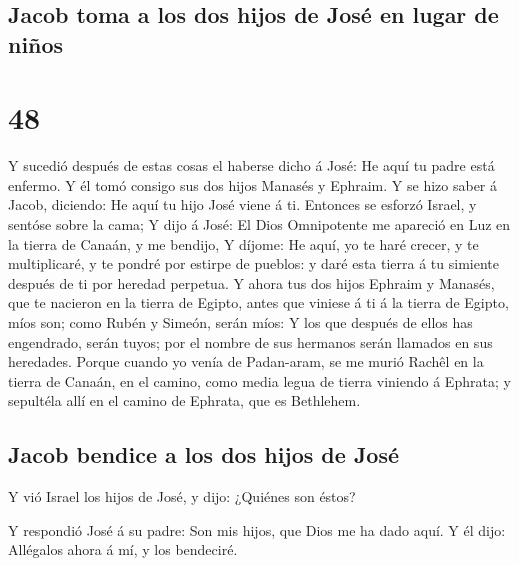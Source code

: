 \hypertarget{jacob-toma-a-los-dos-hijos-de-josuxe9-en-lugar-de-niuxf1os}{%
\subsection{Jacob toma a los dos hijos de José en lugar de
niños}\label{jacob-toma-a-los-dos-hijos-de-josuxe9-en-lugar-de-niuxf1os}}

\hypertarget{section-47}{%
\section{48}\label{section-47}}

 Y sucedió después de estas cosas el haberse dicho á José:
He aquí tu padre está enfermo. Y él tomó consigo sus dos hijos Manasés y
Ephraim.  Y se hizo saber á Jacob, diciendo: He aquí tu hijo
José viene á ti. Entonces se esforzó Israel, y sentóse sobre la cama;
 Y dijo á José: El Dios Omnipotente me apareció en Luz en la
tierra de Canaán, y me bendijo,  Y díjome: He aquí, yo te
haré crecer, y te multiplicaré, y te pondré por estirpe de pueblos: y
daré esta tierra á tu simiente después de ti por heredad perpetua.
 Y ahora tus dos hijos Ephraim y Manasés, que te nacieron en
la tierra de Egipto, antes que viniese á ti á la tierra de Egipto, míos
son; como Rubén y Simeón, serán míos:  Y los que después de
ellos has engendrado, serán tuyos; por el nombre de sus hermanos serán
llamados en sus heredades.  Porque cuando yo venía de
Padan-aram, se me murió Rachêl en la tierra de Canaán, en el camino,
como media legua de tierra viniendo á Ephrata; y sepultéla allí en el
camino de Ephrata, que es Bethlehem.

\hypertarget{jacob-bendice-a-los-dos-hijos-de-josuxe9}{%
\subsection{Jacob bendice a los dos hijos de
José}\label{jacob-bendice-a-los-dos-hijos-de-josuxe9}}

 Y vió Israel los hijos de José, y dijo: ¿Quiénes son éstos?

 Y respondió José á su padre: Son mis hijos, que Dios me ha
dado aquí. Y él dijo: Allégalos ahora á mí, y los bendeciré.

